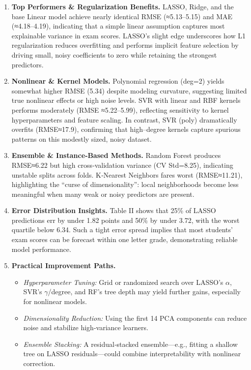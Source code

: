 \documentclass[conference]{IEEEtran}
\begin{document}
\begin{enumerate}
  \item \textbf{Top Performers \& Regularization Benefits.}
    LASSO, Ridge, and the base Linear model achieve nearly identical RMSE (≈5.13–5.15) and MAE (≈4.18–4.19), indicating that a simple linear assumption captures most explainable variance in exam scores. LASSO’s slight edge underscores how L1 regularization reduces overfitting and performs implicit feature selection by driving small, noisy coefficients to zero while retaining the strongest predictors.

  \item \textbf{Nonlinear \& Kernel Models.}
    Polynomial regression (deg=2) yields somewhat higher RMSE (5.34) despite modeling curvature, suggesting limited true nonlinear effects or high noise levels. SVR with linear and RBF kernels performs moderately (RMSE ≈5.22–5.99), reflecting sensitivity to kernel hyperparameters and feature scaling. In contrast, SVR (poly) dramatically overfits (RMSE≈17.9), confirming that high–degree kernels capture spurious patterns on this modestly sized, noisy dataset.

  \item \textbf{Ensemble \& Instance‐Based Methods.}
    Random Forest produces RMSE≈6.22 but high cross‐validation variance (CV Std=8.25), indicating unstable splits across folds. K‐Nearest Neighbors fares worst (RMSE≈11.21), highlighting the “curse of dimensionality”: local neighborhoods become less meaningful when many weak or noisy predictors are present.

  \item \textbf{Error Distribution Insights.}
    Table II shows that 25\% of LASSO predictions err by under 1.82 points and 50\% by under 3.72, with the worst quartile below 6.34. Such a tight error spread implies that most students’ exam scores can be forecast within one letter grade, demonstrating reliable model performance.

  \item \textbf{Practical Improvement Paths.}
    \begin{itemize}
      \item \emph{Hyperparameter Tuning:} Grid or randomized search over LASSO’s $\alpha$, SVR’s $\gamma$/degree, and RF’s tree depth may yield further gains, especially for nonlinear models.
      \item \emph{Dimensionality Reduction:} Using the first 14 PCA components can reduce noise and stabilize high‐variance learners.
      \item \emph{Ensemble Stacking:} A residual‐stacked ensemble—e.g., fitting a shallow tree on LASSO residuals—could combine interpretability with nonlinear correction.
    \end{itemize}
\end{enumerate}
\end{document}
